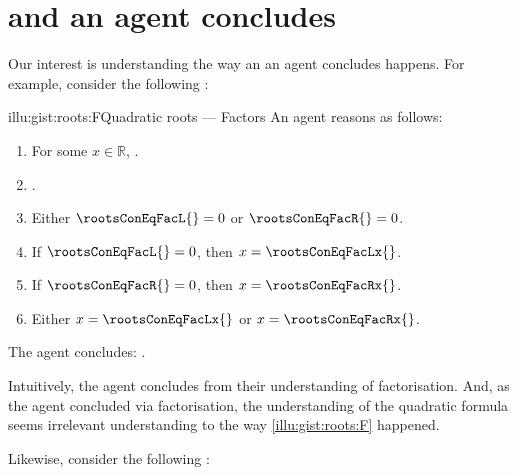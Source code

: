 \chapter{\qWhy{} and \qHow{} an agent concludes}
\label{cha:intro}


\begin{note}
  Our interest is understanding the way an  an agent concludes happens.
  For example, consider the following :

  \begin{rscenario}{illu:gist:roots:F}{Quadratic roots --- Factors}%
    An agent reasons as follows:
    \begin{enumerate}[label=\arabic*., ref=\arabic*]
    \item
      \label{illu:gist:roots:F:eq}
      For some \(x \in \mathbb{R}\), \rootsConEq{}.
    \item
      \label{illu:gist:roots:F:factor}
      \rootsConEqFac{}.
    \item
      \label{illu:gist:roots:F:zero}
      Either \(\rootsConEqFacL{} = 0\) or \(\rootsConEqFacR{} = 0\).
    \item
      \label{illu:gist:roots:F:case:a}
      If \(\rootsConEqFacL{} = 0\), then \(x = \rootsConEqFacLx{}\).
    \item
      \label{illu:gist:roots:F:case:b}
      If \(\rootsConEqFacR{} = 0\), then \(x = \rootsConEqFacRx{}\).
    \item
      \label{illu:gist:roots:F:factor:done}
      Either \(x = \rootsConEqFacLx{}\) or \(x = \rootsConEqFacRx{}\).
    \end{enumerate}
    The agent concludes:
    \rootsCon{}.
  \end{rscenario}

  \noindent%
  Intuitively, the agent concludes \propM{\rootsCon{}} from their understanding of factorisation.
  And, as the agent concluded via factorisation, the \agents{} understanding of the quadratic formula seems irrelevant understanding to the way \autoref{illu:gist:roots:F} happened.

  Likewise, consider the following :


\end{note}
